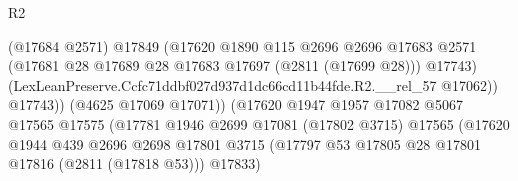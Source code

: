 \begin{lexlean}{R2}
\begin{coremodule}
                                              (@17684 @2571)
                                              @17849
                                              (@17620
                                                @1890
                                                @115
                                                @2696
                                                @2696
                                                @17683
                                                @2571
                                                (@17681
                                                  @28
                                                  @17689
                                                  @28
                                                  @17683
                                                  @17697
                                                  (@2811 (@17699 @28)))
                                                @17743)
                                              (LexLeanPreserve.Ccfc71ddbf027d937d1dc66cd11b44fde.R2.__rel_57
                                                @17062))
                                            @17743))
                                        (@4625 @17069 @17071))
                                      (@17620
                                        @1947
                                        @1957
                                        @17082
                                        @5067
                                        @17565
                                        @17575
                                        (@17781
                                          @1946
                                          @2699
                                          @17081
                                          (@17802 @3715)
                                          @17565
                                          (@17620
                                            @1944
                                            @439
                                            @2696
                                            @2698
                                            @17801
                                            @3715
                                            (@17797
                                              @53
                                              @17805
                                              @28
                                              @17801
                                              @17816
                                              (@2811 (@17818 @53)))
                                            @17833)

\end{coremodule}
\end{lexlean}
